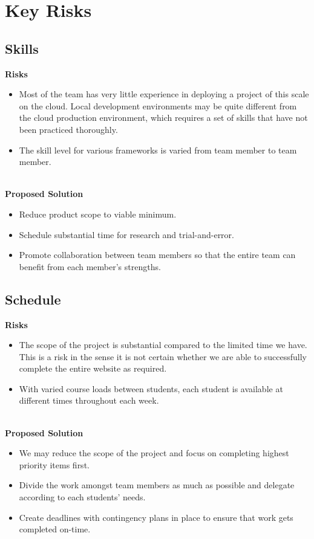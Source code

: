 \section{Key Risks}

\subsection{Skills}
\textbf{Risks}
\begin{itemize}
\item Most of the team has very little experience in deploying a project of this scale on the cloud.  Local development environments may be quite different from the cloud production environment, which requires a set of skills that have not been practiced thoroughly.
\item The skill level for various frameworks is varied from team member to team member.
\end{itemize}\hfill\\
\textbf{Proposed Solution}
\begin{itemize}
\item Reduce product scope to viable minimum.
\item Schedule substantial time for research and trial-and-error.
\item Promote collaboration between team members so that the entire team can benefit from each member's strengths.
\end{itemize}

\subsection{Schedule}
\textbf{Risks}
\begin{itemize}
\item The scope of the project is substantial compared to the limited time we have.\\
This is a risk in the sense it is not certain whether we are able to successfully complete the entire website as required.
\item With varied course loads between students, each student is available at different times throughout each week.
\end{itemize}\hfill\\
\textbf{Proposed Solution}
\begin{itemize}
\item We may reduce the scope of the project and focus on completing highest priority items first.
\item Divide the work amongst team members as much as possible and delegate according to each students' needs.
\item Create deadlines with contingency plans in place to ensure that work gets completed on-time.
\end{itemize}


